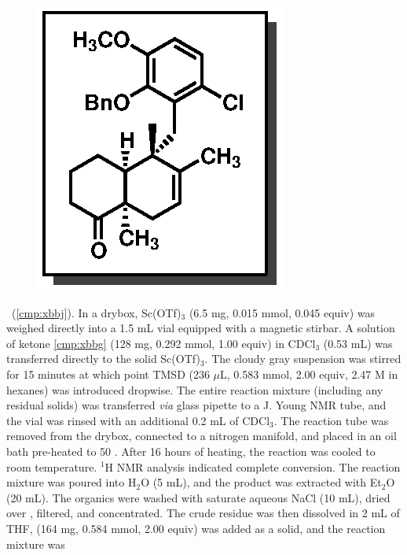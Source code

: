\vspace{10pt}
\begin{figure}
  \vspace{-25pt}
  \begin{center}
    \includegraphics[scale=0.8]{chp_singlecarbon/images/xbbj}
  \end{center}
  \vspace{-30pt}
\end{figure}\noindent \textbf{\CMPxbbj}\ (\ref{cmp:xbbj}). In a drybox, Sc(OTf)$_3$ (6.5 mg,
0.015 mmol, 0.045 equiv) was weighed directly into a 1.5 mL vial
equipped with a magnetic stirbar. A solution of ketone \ref{cmp:xbbg} (128 mg,
0.292 mmol, 1.00 equiv) in CDCl$_3$ (0.53 mL) was transferred directly to the solid Sc(OTf)$_3$. The
cloudy gray suspension was stirred for 15 minutes at which point TMSD (236 $\mu$L, 0.583 mmol,
2.00 equiv, 2.47 M in hexanes) was introduced dropwise. The entire reaction mixture (including
any residual solids) was transferred \textit{via} glass pipette to a J. Young NMR tube, and the vial
was rinsed with an additional 0.2 mL of CDCl$_3$. The reaction tube was removed from the drybox,
connected to a nitrogen manifold, and placed in an oil bath pre-heated to 50 \degc. After 16 hours
of heating, the reaction was cooled to room temperature. $^1$H NMR analysis indicated complete
conversion. The reaction mixture was poured into H$_2$O (5 mL), and the product was extracted
with Et$_2$O (20 mL). The organics were washed with saturate aqueous NaCl (10 mL), dried over
, filtered, and concentrated. The crude residue was then dissolved in 2 mL of THF,
 (164 mg, 0.584 mmol, 2.00 equiv) was added as a solid, and the reaction mixture was
